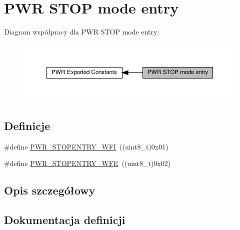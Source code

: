 \hypertarget{group___p_w_r___s_t_o_p__mode__entry}{}\section{P\+WR S\+T\+OP mode entry}
\label{group___p_w_r___s_t_o_p__mode__entry}
Diagram współpracy dla P\+WR S\+T\+OP mode entry\+:\nopagebreak
\begin{figure}[H]
\begin{center}
\leavevmode
\includegraphics[width=350pt]{group___p_w_r___s_t_o_p__mode__entry}
\end{center}
\end{figure}
\subsection*{Definicje}
\begin{DoxyCompactItemize}
\item 
\#define \hyperlink{group___p_w_r___s_t_o_p__mode__entry_ga3bdb1a9c9b421b73ab148d45eb90fa9b}{P\+W\+R\+\_\+\+S\+T\+O\+P\+E\+N\+T\+R\+Y\+\_\+\+W\+FI}~((uint8\+\_\+t)0x01)
\item 
\#define \hyperlink{group___p_w_r___s_t_o_p__mode__entry_ga2e1ee5c9577cc322474a826fa97de798}{P\+W\+R\+\_\+\+S\+T\+O\+P\+E\+N\+T\+R\+Y\+\_\+\+W\+FE}~((uint8\+\_\+t)0x02)
\end{DoxyCompactItemize}


\subsection{Opis szczegółowy}


\subsection{Dokumentacja definicji}
\mbox{\label{group___p_w_r___s_t_o_p__mode__entry_ga2e1ee5c9577cc322474a826fa97de798}} 
